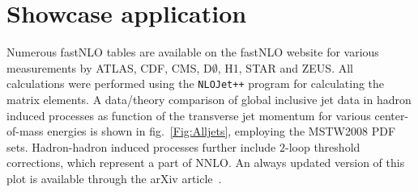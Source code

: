 \documentclass{DISproc}
\begin{document}
%




\section{Showcase application}

Numerous fastNLO tables are available on the fastNLO website
\cite{Fnlo:2012:Online} for various measurements by ATLAS, CDF, CMS,
D$\emptyset$, H1, STAR and ZEUS.  All calculations were performed
using the \texttt{NLOJet++} program \cite{Nagy:99,Nagy:01} for
calculating the matrix elements.  A data/theory comparison of global
inclusive jet data in hadron induced processes as function of the
transverse jet momentum for various center-of-mass energies is shown
in fig.~\ref{Fig:Alljets}, employing the MSTW2008 PDF
sets. Hadron-hadron induced processes further include $2$-loop
threshold corrections, which represent a part of NNLO. An always
updated version of this plot is available through the arXiv
article~\cite{Wobisch:2011ij}.
\end{document}
